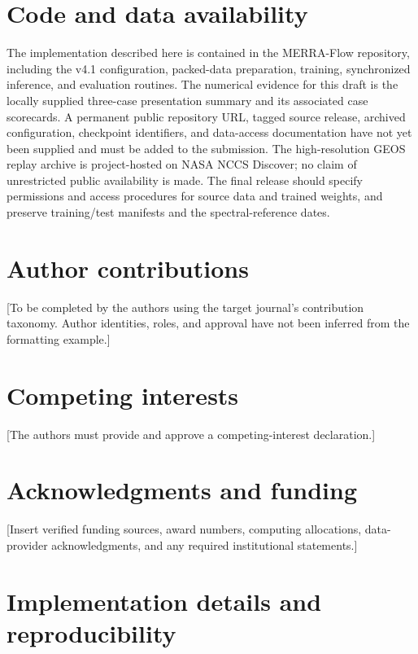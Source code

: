 \documentclass[10pt]{article}
\newcommand{\model}{MERRA-Flow}
\begin{document}
\section*{Code and data availability}
The implementation described here is contained in the \model{} repository, including the v4.1 configuration, packed-data preparation, training, synchronized inference, and evaluation routines. The numerical evidence for this draft is the locally supplied three-case presentation summary and its associated case scorecards. A permanent public repository URL, tagged source release, archived configuration, checkpoint identifiers, and data-access documentation have not yet been supplied and must be added to the submission. The high-resolution GEOS replay archive is project-hosted on NASA NCCS Discover; no claim of unrestricted public availability is made. The final release should specify permissions and access procedures for source data and trained weights, and preserve training/test manifests and the spectral-reference dates.

\section*{Author contributions}
[To be completed by the authors using the target journal's contribution taxonomy. Author identities, roles, and approval have not been inferred from the formatting example.]

\section*{Competing interests}
[The authors must provide and approve a competing-interest declaration.]

\section*{Acknowledgments and funding}
[Insert verified funding sources, award numbers, computing allocations, data-provider acknowledgments, and any required institutional statements.]

\appendix
\section{Implementation details and reproducibility}\label{app:implementation}
\end{document}
